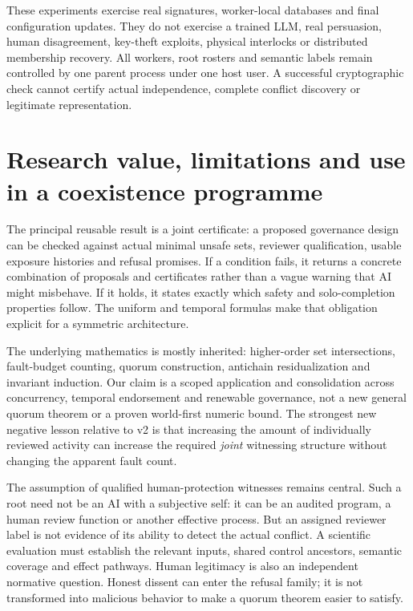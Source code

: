 \documentclass[11pt,a4paper]{article}
\theoremstyle{definition}\newtheorem{definition}{Definition}
\begin{document}
These experiments exercise real signatures, worker-local databases and final configuration updates. They do not exercise a trained LLM, real persuasion, human disagreement, key-theft exploits, physical interlocks or distributed membership recovery. All workers, root rosters and semantic labels remain controlled by one parent process under one host user. A successful cryptographic check cannot certify actual independence, complete conflict discovery or legitimate representation.

\section{Research value, limitations and use in a coexistence programme}
The principal reusable result is a joint certificate: a proposed governance design can be checked against actual minimal unsafe sets, reviewer qualification, usable exposure histories and refusal promises. If a condition fails, it returns a concrete combination of proposals and certificates rather than a vague warning that AI might misbehave. If it holds, it states exactly which safety and solo-completion properties follow. The uniform and temporal formulas make that obligation explicit for a symmetric architecture.

The underlying mathematics is mostly inherited: higher-order set intersections, fault-budget counting, quorum construction, antichain residualization and invariant induction. Our claim is a scoped application and consolidation across concurrency, temporal endorsement and renewable governance, not a new general quorum theorem or a proven world-first numeric bound. The strongest new negative lesson relative to v2 is that increasing the amount of individually reviewed activity can increase the required \emph{joint} witnessing structure without changing the apparent fault count.

The assumption of qualified human-protection witnesses remains central. Such a root need not be an AI with a subjective self: it can be an audited program, a human review function or another effective process. But an assigned reviewer label is not evidence of its ability to detect the actual conflict. A scientific evaluation must establish the relevant inputs, shared control ancestors, semantic coverage and effect pathways. Human legitimacy is also an independent normative question. Honest dissent can enter the refusal family; it is not transformed into malicious behavior to make a quorum theorem easier to satisfy.
\end{document}
